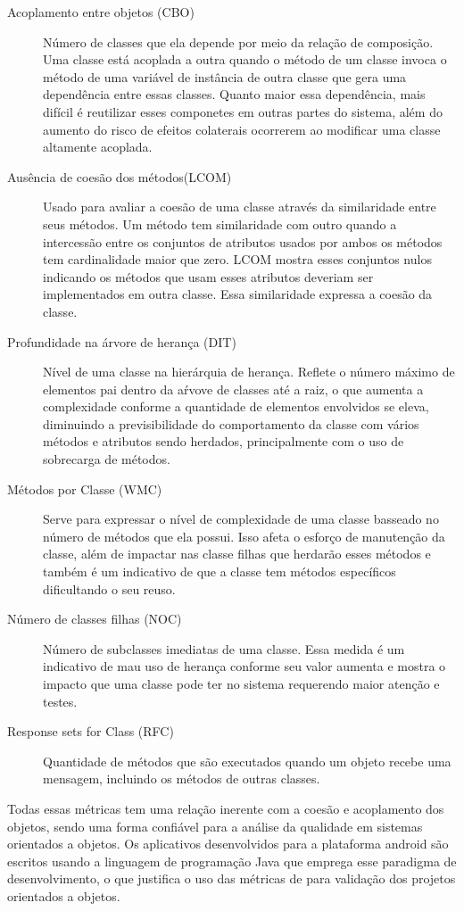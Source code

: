 \begin{description}
\item[Acoplamento entre objetos (CBO)] Número de classes que ela depende por
meio da relação de composição. Uma classe está acoplada a outra quando o método
de um classe invoca o método de uma variável de instância de outra classe que
gera uma dependência entre essas classes. Quanto maior essa dependência, mais
difícil é reutilizar esses componetes em outras partes do sistema, além do
aumento do risco de efeitos colaterais ocorrerem ao modificar uma classe
altamente acoplada.
\item[Ausência de coesão dos métodos(LCOM)] Usado para avaliar a coesão de uma
classe através da similaridade entre seus métodos. Um método tem similaridade
com outro quando a intercessão entre os conjuntos de atributos usados por ambos
os métodos tem cardinalidade maior que zero. LCOM mostra esses conjuntos nulos
indicando os métodos que usam esses atributos deveriam ser implementados em
outra classe. Essa similaridade expressa a coesão da classe.
\item[Profundidade na árvore de herança (DIT)] Nível de uma classe na
hierárquia de herança. Reflete o número máximo de elementos pai dentro da aŕvove
de classes até a raiz, o que aumenta a complexidade conforme a quantidade de
elementos envolvidos se eleva, diminuindo a previsibilidade do comportamento da
classe com vários métodos e atributos sendo herdados, principalmente com o uso
de sobrecarga de métodos.
\item[Métodos por Classe (WMC)] Serve para expressar o nível de complexidade de
uma classe basseado no número de métodos que ela possui. Isso afeta o esforço de
manutenção da classe, além de impactar nas classe filhas que herdarão esses
métodos e também é um indicativo de que a classe tem métodos específicos
dificultando o seu reuso.
\item[Número de classes filhas (NOC)] Número de subclasses imediatas de uma
classe. Essa medida é um indicativo de mau uso de herança conforme seu valor
aumenta e mostra o impacto que uma classe pode ter no sistema requerendo maior
atenção e testes.
\item[Response sets for Class (RFC)] Quantidade de métodos que são executados
quando um objeto recebe uma mensagem, incluindo os métodos de outras classes. 
\end{description}

Todas essas métricas tem uma relação inerente com a coesão e acoplamento dos
objetos, sendo uma forma confiável para a análise da qualidade em sistemas
orientados a objetos. Os aplicativos desenvolvidos para a plataforma android são
escritos usando a linguagem de programação Java que emprega esse paradigma de
desenvolvimento, o que justifica o uso das métricas de  para
validação dos projetos orientados a objetos.

